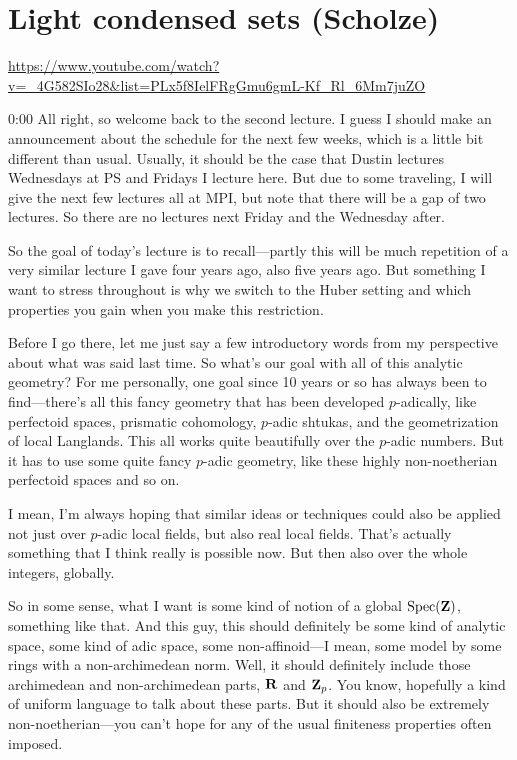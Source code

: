 
\section{\ufs Light condensed sets (Scholze)}

\url{https://www.youtube.com/watch?v=_4G582SIo28&list=PLx5f8IelFRgGmu6gmL-Kf_Rl_6Mm7juZO}
\renewcommand{\yt}[2]{\href{https://www.youtube.com/watch?v=_4G582SIo28&list=PLx5f8IelFRgGmu6gmL-Kf_Rl_6Mm7juZO&t=#1}{#2}}
\vspace{1em}

\begin{unfinished}{0:00}
All right, so welcome back to the second lecture. I guess I should make an announcement about the schedule for the next few weeks, which is a little bit different than usual. Usually, it should be the case that Dustin lectures Wednesdays at PS and Fridays I lecture here. But due to some traveling, I will give the next few lectures all at MPI, but note that there will be a gap of two lectures. So there are no lectures next Friday and the Wednesday after.

So the goal of today's lecture is to recall---partly this will be much repetition of a very similar lecture I gave four years ago, also five years ago. But something I want to stress throughout is why we switch to the Huber setting and which properties you gain when you make this restriction.

Before I go there, let me just say a few introductory words from my perspective about what was said last time. So what's our goal with all of this analytic geometry? For me personally, one goal since 10 years or so has always been to find---there's all this fancy geometry that has been developed $p$-adically, like perfectoid spaces, prismatic cohomology, $p$-adic shtukas, and the geometrization of local Langlands. This all works quite beautifully over the $p$-adic numbers. But it has to use some quite fancy $p$-adic geometry, like these highly non-noetherian perfectoid spaces and so on.

I mean, I'm always hoping that similar ideas or techniques could also be applied not just over $p$-adic local fields, but also real local fields. That's actually something that I think really is possible now. But then also over the whole integers, globally.

So in some sense, what I want is some kind of notion of a global $\operatorname{Spec}(\mathbf Z)$, something like that. And this guy, this should definitely be some kind of analytic space, some kind of adic space, some non-affinoid---I mean, some model by some rings with a non-archimedean norm. Well, it should definitely include those archimedean and non-archimedean parts, $\mathbf R$ and $\mathbf Z_p$. You know, hopefully a kind of uniform language to talk about these parts. But it should also be extremely non-noetherian---you can't hope for any of the usual finiteness properties often imposed.


\end{unfinished}
